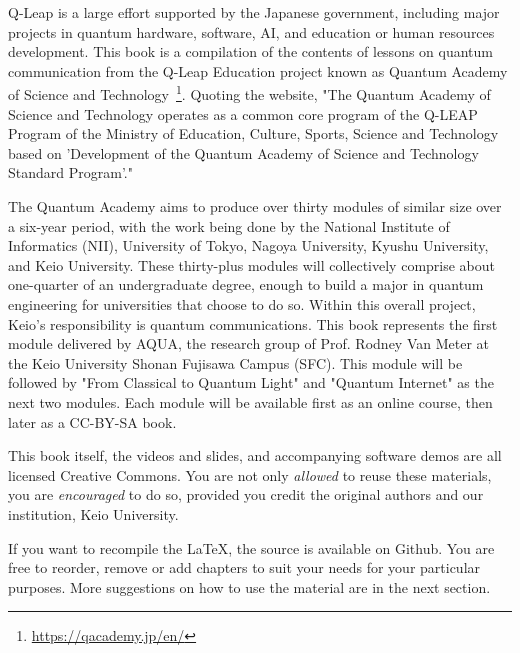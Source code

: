 
\begin{preface}
Q-Leap is a large effort supported by the Japanese government, including major projects in quantum hardware, software, AI, and education or human resources development.  This book is a compilation of the contents of lessons on quantum communication from the Q-Leap Education project known as Quantum Academy of Science and Technology~\footnote{\url{https://qacademy.jp/en/}}. Quoting the website, "The Quantum Academy of Science and Technology operates as a common core program of the Q-LEAP Program of the Ministry of Education, Culture, Sports, Science and Technology based on 'Development of the Quantum Academy of Science and Technology Standard Program'."

The Quantum Academy aims to produce over thirty modules of similar size over a six-year period, with the work being done by the National Institute of Informatics (NII), University of Tokyo, Nagoya University, Kyushu University, and Keio University.  These thirty-plus modules will collectively comprise about one-quarter of an undergraduate degree, enough to build a major in quantum engineering for universities that choose to do so. Within this overall project, Keio's responsibility is quantum communications.  This book represents the first module delivered by AQUA, the research group of Prof. Rodney Van Meter at the Keio University Shonan Fujisawa Campus (SFC).  This module will be followed by "From Classical to Quantum Light" and "Quantum Internet" as the next two modules.  Each module will be available first as an online course, then later as a CC-BY-SA book.

This book itself, the videos and slides, and accompanying software demos are all licensed Creative Commons. You are not only \emph{allowed} to reuse these materials, you are \emph{encouraged} to do so, provided you credit the original authors and our institution, Keio University.

If you want to recompile the \LaTeX, the source is available on Github. You are free to reorder, remove or add chapters to suit your needs for your particular purposes.  More suggestions on how to use the material are in the next section.

\author{Michal and Rodney}
\date{sometime in 2022}
\end{preface}


